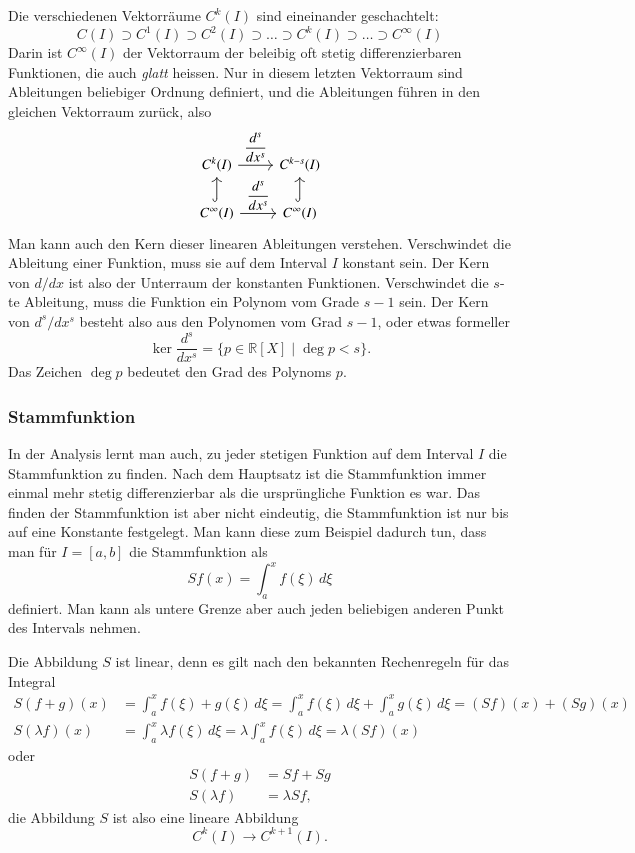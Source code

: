 Die verschiedenen Vektorräume $C^k(I)$ sind eineinander
geschachtelt:
\[
C(I) \supset C^1(I) \supset C^2(I)\supset \dots \supset
C^k(I) \supset \dots \supset C^\infty(I)
\]
Darin ist $C^\infty(I)$ der Vektorraum der beleibig oft stetig
differenzierbaren Funktionen, die auch {\em glatt} heissen.
%
Nur in diesem letzten Vektorraum sind Ableitungen beliebiger Ordnung
definiert, und die Ableitungen führen in den gleichen Vektorraum zurück,
also
\[
\begin{tikzcd}
C^k(I) \ar[r,"\displaystyle\frac{d^s}{dx^s}"]
	& C^{k-s}(I)
\\
C^\infty(I) \ar[r,"\displaystyle\frac{d^s}{dx^s}"] \ar[u,hook]
	&C^\infty(I) \ar[u,hook]
\end{tikzcd}
\]
Man kann auch den Kern dieser linearen Ableitungen verstehen.
Verschwindet die Ableitung einer Funktion, muss sie auf dem Interval
$I$ konstant sein.
Der Kern von $d/dx$ ist also der Unterraum der konstanten Funktionen.
Verschwindet die $s$-te Ableitung, muss die Funktion ein Polynom
vom Grade $s-1$ sein.
Der Kern von $d^s/dx^s$ besteht also aus den Polynomen vom Grad $s-1$,
oder etwas formeller
\[
\operatorname{ker}\frac{d^s}{dx^s} = \{ p\in \mathbb R[X]\;|\; \deg p < s\}.
\]
Das Zeichen $\deg p$ bedeutet den Grad des Polynoms $p$.

\subsubsection{Stammfunktion}
In der Analysis lernt man auch, zu jeder stetigen Funktion auf dem
Interval $I$ die Stammfunktion zu finden. 
Nach dem Hauptsatz ist die Stammfunktion immer einmal mehr stetig
differenzierbar als die ursprüngliche Funktion es war.
Das finden der Stammfunktion ist aber nicht eindeutig, die Stammfunktion
ist nur bis auf eine Konstante festgelegt.
Man kann diese zum Beispiel dadurch tun, dass man für $I=[a,b]$ die
Stammfunktion als
\[
Sf(x) = \int_a^x f(\xi)\,d\xi
\]
definiert.
Man kann als untere Grenze aber auch jeden beliebigen anderen Punkt
des Intervals nehmen.

Die Abbildung $S$ ist linear, denn es gilt nach den bekannten
Rechenregeln für das Integral
\begin{align*}
S(f+g)(x)
&=
\int_a^x f(\xi) + g(\xi)\,d\xi
=
\int_a^x f(\xi)\,d\xi + \int_a^xg(\xi)\,d\xi
=
(Sf)(x) + (Sg)(x)
\\
S(\lambda f)(x)
&=
\int_a^x \lambda f(\xi)\,d\xi
=
\lambda \int_a^x f(\xi)\,d\xi
=
\lambda (Sf)(x)
\end{align*}
oder
\begin{align*}
S(f+g)&=Sf+Sg
\\
S(\lambda f)&=\lambda Sf,
\end{align*}
die Abbildung $S$ ist also eine lineare Abbildung
\[
C^k(I)\to C^{k+1}(I).
\]

